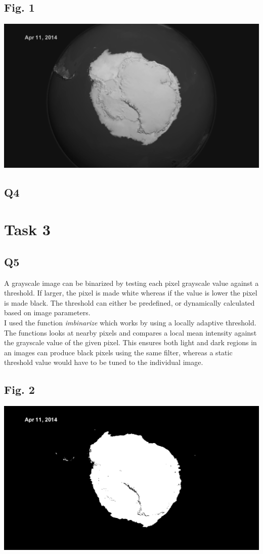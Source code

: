 \documentclass[11pt]{article}
\begin{document}
\subsection*{Fig. 1}
\includegraphics[width=\textwidth]{reportImages/figure1}

\subsection*{Q4}

\section*{Task 3}
\subsection*{Q5}
A grayscale image can be binarized by testing each pixel grayscale value against a threshold. If larger, the pixel is made white whereas if the value is lower the pixel is made black. The threshold can either be predefined, or dynamically calculated based on image parameters. \\

 I used the function \textit{imbinarize} which works by using a locally adaptive threshold. The functions looks at nearby pixels and compares a local mean intensity against the grayscale value of the given pixel. This ensures both light and dark regions in an images can produce black pixels using the same filter, whereas a static threshold value would have to be tuned to the individual image.

\subsection*{Fig. 2}
\includegraphics[width=\textwidth]{reportImages/figure2}
\end{document}
